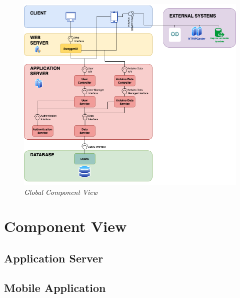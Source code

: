 \begin{figure}[H]
\begin{center}
  \includegraphics[width=\textwidth]{img/archi/components.png}
  \hspace{0.05\linewidth}
  \centering
  \caption{\textit{Global Component View}}
  \label{img:archi_components}
\end{center}
\end{figure}

\section{Component View}

\subsection{Application Server}

\subsection{Mobile Application}\label{sec:cv_mobile}